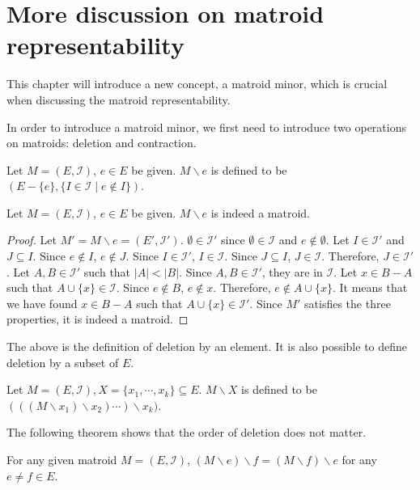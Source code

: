 \section{More discussion on matroid representability}
This chapter will introduce a new concept, a matroid minor, which is crucial when discussing the matroid representability.

In order to introduce a matroid minor, we first need to introduce two operations on matroids: deletion and contraction.

\begin{defn}
Let $M = (E, \mathcal{I})$, $e \in E$ be given.
$M \backslash e$ is defined to be $(E - \{ e \}, \{ I \in \mathcal{I} \mid e \notin I \})$.
\end{defn}

\begin{thm}
Let $M = (E, \mathcal{I})$, $e \in E$ be given.
$M \backslash e$ is indeed a matroid.
\end{thm}

\begin{proof}
Let $M' = M \backslash e = (E', \mathcal{I}')$.
$\emptyset \in \mathcal{I}'$ since $\emptyset \in \mathcal{I}$ and $e \notin \emptyset$.
Let $I \in \mathcal{I}'$ and $J \subseteq I$.
Since $e \notin I$, $e \notin J$.
Since $I \in \mathcal{I}'$, $I \in \mathcal{I}$.
Since $J \subseteq I$, $J \in \mathcal{I}$.
Therefore, $J \in \mathcal{I}'$.
Let $A, B \in \mathcal{I}'$ such that $\lvert A \rvert < \lvert B \rvert$.
Since $A, B \in \mathcal{I}'$, they are in $\mathcal{I}$.
Let $x \in B - A$ such that $A \cup \{ x \} \in \mathcal{I}$.
Since $e \notin B$, $e \notin x$.
Therefore, $e \notin A \cup \{ x \}$.
It means that we have found $x \in B - A$ such that $A \cup \{ x \} \in \mathcal{I}'$.
Since $M'$ satisfies the three properties, it is indeed a matroid.
\end{proof}

The above is the definition of deletion by an element.
It is also possible to define deletion by a subset of $E$.

\begin{defn}
Let $M = (E, \mathcal{I}), X = \{ x_1, \cdots, x_k \} \subseteq E$.
$M \backslash X$ is defined to be $(((M \backslash x_1) \backslash x_2) \cdots) \backslash x_k)$.
\end{defn}

The following theorem shows that the order of deletion does not matter.

\begin{thm}
For any given matroid $M = (E, \mathcal{I})$,
$(M \backslash e) \backslash f = (M \backslash f) \backslash e$ for any $e \neq f \in E$.
\end{thm}

